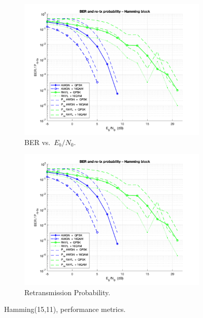 \begin{figure}[H]

    \centering
    \begin{subfigure}{0.45\textwidth}
        \includegraphics*[scale = 0.18]{Images/BlockCode.png}
        \caption{BER vs.\ $E_b/N_0$.}
        \label{fig:Hamm_BER}
    \end{subfigure}
    \begin{subfigure}{0.45\textwidth}
        \includegraphics*[scale = 0.19]{Images/BlockCode.png}
        \caption{Retransmission Probability.}
        \label{fig:Pret_Sim}
    \end{subfigure}
    
    \caption{Hamming(15,11), performance metrics.}
    \label{fig:Hamm_performance}
\end{figure}


